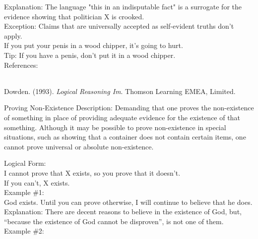 \documentclass[a4paper,12pt,single,pdftex]{scrartcl}
\begin{document}
    
      Explanation: The language "this in an indisputable fact" is a surrogate for the evidence showing that politician X is crooked.
    \\

    
      Exception: Claims that are universally accepted as self-evident truths don't apply.
    \\

    
      If you put your penis in a wood chipper, it's going to hurt.
    \\

    
      Tip: If you have a penis, don't put it in a wood chipper.
    \\

    References:

    
      
        
      \\

      
        
          Dowden. (1993). {\it Logical Reasoning Im}. Thomson Learning EMEA, Limited.
        
      
    
  

Proving Non-Existence
    Description: Demanding that one proves the non-existence of something in place of providing adequate evidence for the existence of that something.  Although it may be possible to prove non-existence in special situations, such as showing that a container does not contain certain items, one cannot prove universal or absolute non-existence.

    
      Logical Form:
    \\

    
      I cannot prove that X exists, so you prove that it doesn’t.
    \\

    
      If you can’t, X exists.
    \\

    
      Example \#1:
    \\

    
      God exists.  Until you can prove otherwise, I will continue to believe that he does.
    \\

    
      Explanation: There are decent reasons to believe in the existence of God, but, “because the existence of God cannot be disproven”, is not one of them.
    \\

    
      Example \#2:
    \\
\end{document}
